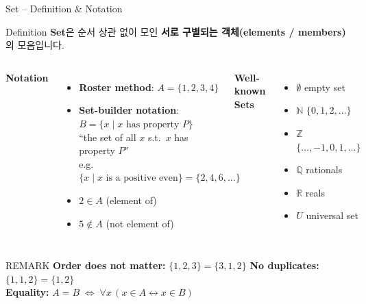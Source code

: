 \documentclass{beamer}
\begin{document}
\begin{frame}[t,shrink=3]{Set -- Definition \& Notation}
    \small
    \vspace{0.1cm}
    \begin{block}{Definition}
        \textbf{Set}은 순서 상관 없이 모인 \textbf{서로 구별되는 객체(elements / members)}의 모음입니다.
    \end{block}

    \vspace{0.1cm}
    \begin{columns}[T]
        \textbf{Notation}
        \vspace{0.05cm}

        \footnotesize
        \begin{itemize}\setlength\itemsep{0.2em}
            \item \textbf{Roster method}: $A = \{1, 2, 3, 4\}$
            \item \textbf{Set-builder notation}:\\
                  $B = \{x \mid x \text{ has property } P\}$\\
                  ``the set of all $x$ s.t.\ $x$ has property $P$''\\
                  e.g.\ $\{x \mid x \text{ is a positive even}\} = \{2,4,6,\ldots\}$
            \item $2 \in A$ \quad (element of)
            \item $5 \notin A$ \quad (not element of)
        \end{itemize}

        \textbf{Well-known Sets}
        \vspace{0.05cm}

        \footnotesize
        \begin{itemize}\setlength\itemsep{0.2em}
            \item $\emptyset$ \quad empty set
            \item $\mathbb{N}$ \quad $\{0, 1, 2, \ldots\}$
            \item $\mathbb{Z}$ \quad $\{\ldots, -1, 0, 1, \ldots\}$
            \item $\mathbb{Q}$ \quad rationals
            \item $\mathbb{R}$ \quad reals
            \item $U$ \quad universal set
        \end{itemize}
    \end{columns}

    \vspace{0.15cm}
    \begin{alertblock}{REMARK}
        \scriptsize
        \textbf{Order does not matter:} $\{1, 2, 3\} = \{3, 1, 2\}$ \qquad
        \textbf{No duplicates:} $\{1, 1, 2\} = \{1, 2\}$\\[2pt]
        \textbf{Equality:} $A = B \;\Leftrightarrow\; \forall x\,(x \in A \leftrightarrow x \in B)$
    \end{alertblock}
\end{frame}
\end{document}
